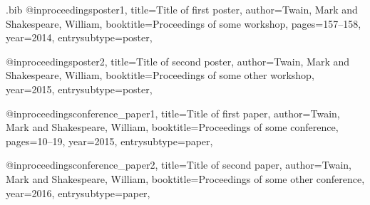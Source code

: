 \begin{filecontents}{\jobname.bib}
    @inproceedings{poster1,
      title={Title of first poster},
      author={Twain, Mark and Shakespeare, William},
      booktitle={Proceedings of some workshop},
      pages={157--158},
      year={2014},
      entrysubtype={poster},
    }
    
    @inproceedings{poster2,
      title={Title of second poster},
      author={Twain, Mark and Shakespeare, William},
      booktitle={Proceedings of some other workshop},
      year={2015},
      entrysubtype={poster},
    }
    
    @inproceedings{conference_paper1,
      title={Title of first paper},
      author={Twain, Mark and Shakespeare, William},
      booktitle={Proceedings of some conference},
      pages={10--19},
      year={2015},
      entrysubtype={paper},
    }
    
    @inproceedings{conference_paper2,
      title={Title of second paper},
      author={Twain, Mark and Shakespeare, William},
      booktitle={Proceedings of some other conference},
      year={2016},
      entrysubtype={paper},
    }
    \end{filecontents}
    
    \documentclass[nobib]{tufte-book}
    \usepackage[backend=biber,natbib=true,defernumbers=true]{biblatex}
    
    
    
    
    \nocite{*}
    \renewcommand\bibname{List of Publications}
    \printbibheading
    \printbibliography[subtype=poster,heading=subbibliography,title=Posters]
    \printbibliography[subtype=paper,heading=subbibliography,title=Papers]
    
    